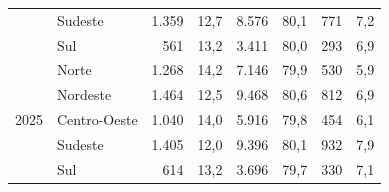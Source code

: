 \documentclass[12pt,a4paper,header]{abnt}
\begin{document}
\begin{table}[ht]
\begin{tabular}{llrrrrrr}
                      & Sudeste      & 1.359 & 12,7 & 8.576 & 80,1 & 771 & 7,2 \\
                      & Sul          & 561 & 13,2 & 3.411 & 80,0 & 293 & 6,9 \\
\midrule
\multirow{5}{*}{2025} & Norte        & 1.268 & 14,2 & 7.146 & 79,9 & 530 & 5,9 \\
                      & Nordeste     & 1.464 & 12,5 & 9.468 & 80,6 & 812 & 6,9 \\
                      & Centro-Oeste & 1.040 & 14,0 & 5.916 & 79,8 & 454 & 6,1 \\
                      & Sudeste      & 1.405 & 12,0 & 9.396 & 80,1 & 932 & 7,9 \\
                      & Sul          & 614 & 13,2 & 3.696 & 79,7 & 330 & 7,1 \\
\bottomrule
\end{tabular}
\end{table}
\end{document}
